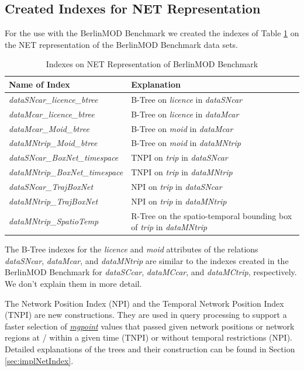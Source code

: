 \documentclass[a4paper]{article}
\newcommand{\bmodb} {BerlinMOD Benchmark}
\newcommand{\dt}[1]{\textsl{\underline{#1}}}
\begin{document}
\subsection{Created Indexes for NET Representation}
\label{sec:createIndex}
For the use with the \bmodb{} we created the indexes of Table
\ref{tab:NETIndexes} on the NET representation of the \bmodb{} data sets.
\begin{table}[htbp]
  \caption{Indexes on NET Representation of \bmodb{}}
  \label{tab:NETIndexes}
  \begin{tabularx}{\textwidth}{|l|X|}
    \hline
    \textbf{Name of Index}                 & \textbf{Explanation}\\
    \hline
    \textit{dataSNcar\_licence\_btree}     & B-Tree on \textit{licence} in \textit{dataSNcar}\\
    \hline
    \textit{dataMcar\_licence\_btree}      & B-Tree on \textit{licence} in \textit{dataMcar}\\
    \hline
    \textit{dataMcar\_Moid\_btree}         & B-Tree on \textit{moid} in \textit{dataMcar}\\
    \hline
    \textit{dataMNtrip\_Moid\_btree}       & B-Tree on \textit{moid} in \textit{dataMNtrip}\\
    \hline
    \textit{dataSNcar\_BoxNet\_timespace}  & TNPI on \textit{trip} in \textit{dataSNcar}\\
    \hline
    \textit{dataMNtrip\_BoxNet\_timespace} & TNPI on \textit{trip} in \textit{dataMNtrip}\\
    \hline
    \textit{dataSNcar\_TrajBoxNet}         & NPI on \textit{trip} in \textit{dataSNcar}\\
    \hline
    \textit{dataMNtrip\_TrajBoxNet}        & NPI on \textit{trip} in \textit{dataMNtrip}\\
    \hline
    \textit{dataMNtrip\_SpatioTemp}        & R-Tree on the spatio-temporal bounding box of \textit{trip} in \textit{dataMNtrip}\\
    \hline
  \end{tabularx}
\end{table}

The B-Tree indexes for the \textit{licence} and \textit{moid} attributes of the relations
\textit{dataSNcar}, \textit{dataMcar}, and \textit{dataMNtrip} are similar to the indexes
created in the \bmodb{} for \textit{dataSCcar}, \textit{dataMCcar}, and \textit{dataMCtrip},
respectively. We don't explain them in more detail.

The Network Position Index (NPI) and the Temporal Network Position Index (TNPI)
are new constructions. They are used in query processing to support a faster
selection of \dt{mgpoint} values that passed given network positions or network
regions at / within a given time (TNPI) or without temporal restrictions (NPI).
Detailed explanations of the trees and their construction can be found in
Section \ref{sec:implNetIndex}.
\end{document}
